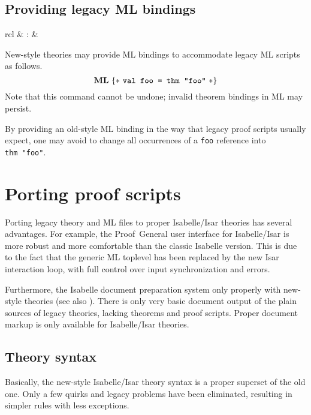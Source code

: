\subsection{Providing legacy ML bindings}

\begin{matharray}{rcl}
   & : & \isartrans{\cdot}{\cdot} \\
\end{matharray}

New-style theories may provide ML bindings to accommodate legacy ML scripts as
follows.
\[
{\mathord{\mathbf{ML}}}~\{*~\mbox{\texttt{val foo = thm "foo"}}~*\}
\]
Note that this command cannot be undone; invalid theorem bindings in ML may
persist.

By providing an old-style ML binding in the way that legacy proof scripts
usually expect, one may avoid to change all occurrences of a \texttt{foo}
reference into \texttt{thm~"foo"}.


\section{Porting proof scripts}

Porting legacy theory and ML files to proper Isabelle/Isar theories has
several advantages.  For example, the Proof~General user interface
\cite{proofgeneral} for Isabelle/Isar is more robust and more comfortable than
the classic Isabelle version.  This is due to the fact that the generic ML
toplevel has been replaced by the new Isar interaction loop, with full control
over input synchronization and errors.

Furthermore, the Isabelle document preparation system only properly with
new-style theories (see also \cite{isabelle-system}).  There is only very
basic document output of the plain sources of legacy theories, lacking
theorems and proof scripts.  Proper document markup is only available for
Isabelle/Isar theories.


\subsection{Theory syntax}

Basically, the new-style Isabelle/Isar theory syntax is a proper superset of
the old one.  Only a few quirks and legacy problems have been eliminated,
resulting in simpler rules with less exceptions.

